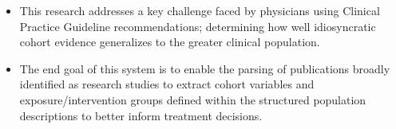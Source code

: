 \documentclass[10pt]{article}
\newcommand{\tabularxwidth}{\textwidth}
\begin{document}
\begin{minipage}{\tabularxwidth}
\begin{itemize}[noitemsep, topsep=3pt, parsep=0pt, partopsep=0pt]
                \item 
    This research addresses a key challenge faced by physicians using Clinical Practice Guideline recommendations; determining how well idiosyncratic cohort evidence generalizes to the greater clinical population.
            
                \item 
    The end goal of this system is to enable the parsing of publications broadly identified as research studies to extract cohort variables and exposure/intervention groups defined within the structured population descriptions to better inform treatment decisions.
            
        \end{itemize}

        
            \vspace{.5em}
        

        \end{minipage}
    
\end{document}
